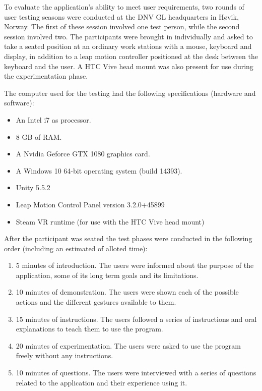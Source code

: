 To evaluate the application's ability to meet user requirements, two rounds of user testing seasons were conducted at the DNV GL headquarters in Høvik, Norway.
The first of these session involved one test person, while the second session involved two. 
The participants were brought in individually and asked to take a seated position at an ordinary work stations with a mouse, keyboard and display, 
in addition to a leap motion controller positioned at the desk between the keyboard and the user. A HTC Vive head mount was also present for use during the experimentation phase. 

The computer used for the testing had the following specifications (hardware and software):
\begin{itemize}
    \item An Intel i7 as processor.
    \item 8 GB of RAM.
    \item A Nvidia Geforce GTX 1080 graphics card.
    \item A Windows 10 64-bit operating system (build 14393).
    \item Unity 5.5.2
    \item Leap Motion Control Panel version 3.2.0+45899
    \item Steam VR runtime (for use with the HTC Vive head mount)
\end{itemize}

After the participant was seated the test phases were conducted in the following order (including an estimated of alloted time):

\begin{enumerate}
    \item  5 minutes of introduction. The users were informed about the purpose of the application, some of its long term goals and its limitations.
    \item 10 minutes of demonstration. The users were shown each of the possible actions and the different gestures available to them.
    \item 15 minutes of instructions. The users followed a series of instructions and oral explanations to teach them to use the program.
    \item 20 minutes of experimentation. The users were asked to use the program freely without any instructions.  
    \item 10 minutes of questions. The users were interviewed with a series of questions related to the application and their experience using it.   
\end{enumerate}

